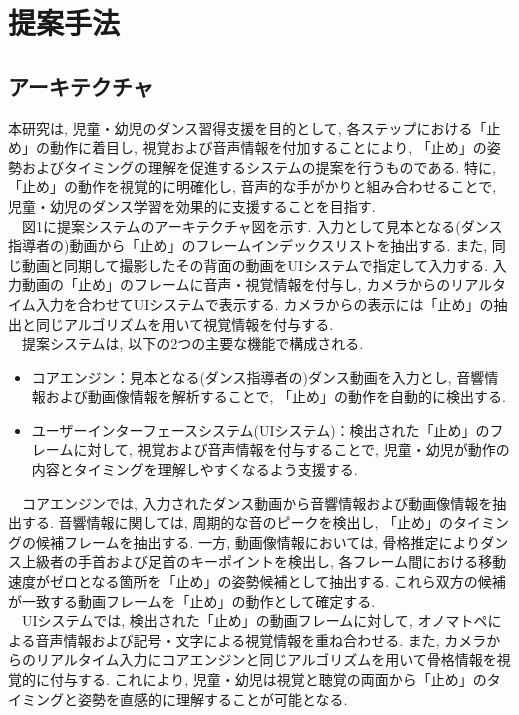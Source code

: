 \documentclass[paper]{ieicej}
\begin{document}
\section{提案手法}
\subsection{アーキテクチャ}
本研究は, 児童・幼児のダンス習得支援を目的として, 各ステップにおける「止め」の動作に着目し, 視覚および音声情報を付加することにより, 「止め」の姿勢およびタイミングの理解を促進するシステムの提案を行うものである. 特に, 「止め」の動作を視覚的に明確化し, 音声的な手がかりと組み合わせることで, 児童・幼児のダンス学習を効果的に支援することを目指す. \\
　図1に提案システムのアーキテクチャ図を示す. 入力として見本となる(ダンス指導者の)動画から「止め」のフレームインデックスリストを抽出する. また, 同じ動画と同期して撮影したその背面の動画をUIシステムで指定して入力する. 入力動画の「止め」のフレームに音声・視覚情報を付与し, カメラからのリアルタイム入力を合わせてUIシステムで表示する. カメラからの表示には「止め」の抽出と同じアルゴリズムを用いて視覚情報を付与する. \\
　提案システムは, 以下の2つの主要な機能で構成される.
\begin{itemize}[nosep]
  \item コアエンジン：見本となる(ダンス指導者の)ダンス動画を入力とし, 音響情報および動画像情報を解析することで, 「止め」の動作を自動的に検出する. 
  \item ユーザーインターフェースシステム(UIシステム)：検出された「止め」のフレームに対して, 視覚および音声情報を付与することで, 児童・幼児が動作の内容とタイミングを理解しやすくなるよう支援する. 
\end{itemize}
　コアエンジンでは, 入力されたダンス動画から音響情報および動画像情報を抽出する. 音響情報に関しては, 周期的な音のピークを検出し, 「止め」のタイミングの候補フレームを抽出する. 一方, 動画像情報においては, 骨格推定によりダンス上級者の手首および足首のキーポイントを検出し, 各フレーム間における移動速度がゼロとなる箇所を「止め」の姿勢候補として抽出する. これら双方の候補が一致する動画フレームを「止め」の動作として確定する.  \\
　UIシステムでは, 検出された「止め」の動画フレームに対して, オノマトペによる音声情報および記号・文字による視覚情報を重ね合わせる. また, カメラからのリアルタイム入力にコアエンジンと同じアルゴリズムを用いて骨格情報を視覚的に付与する. これにより, 児童・幼児は視覚と聴覚の両面から「止め」のタイミングと姿勢を直感的に理解することが可能となる. \\
\end{document}
